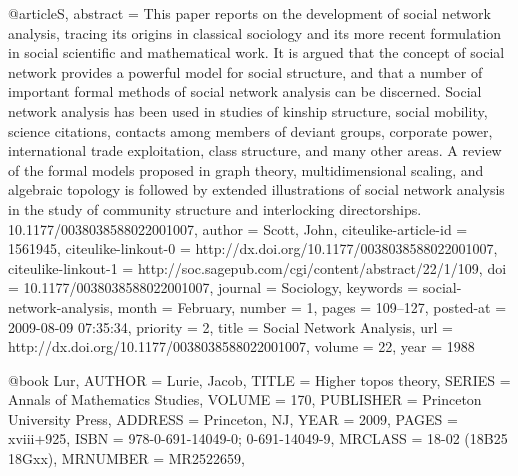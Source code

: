 @article{S,
    abstract = {This paper reports on the development of social network analysis, tracing its origins in classical sociology and its more recent formulation in social scientific and mathematical work. It is argued that the concept of social network provides a powerful model for social structure, and that a number of important formal methods of social network analysis can be discerned. Social network analysis has been used in studies of kinship structure, social mobility, science citations, contacts among members of deviant groups, corporate power, international trade exploitation, class structure, and many other areas. A review of the formal models proposed in graph theory, multidimensional scaling, and algebraic topology is followed by extended illustrations of social network analysis in the study of community structure and interlocking directorships. 10.1177/0038038588022001007},
    author = {Scott, John},
    citeulike-article-id = {1561945},
    citeulike-linkout-0 = {http://dx.doi.org/10.1177/0038038588022001007},
    citeulike-linkout-1 = {http://soc.sagepub.com/cgi/content/abstract/22/1/109},
    doi = {10.1177/0038038588022001007},
    journal = {Sociology},
    keywords = {social-network-analysis},
    month = {February},
    number = {1},
    pages = {109--127},
    posted-at = {2009-08-09 07:35:34},
    priority = {2},
    title = {Social Network Analysis},
    url = {http://dx.doi.org/10.1177/0038038588022001007},
    volume = {22},
    year = {1988}
}

@book {Lur,
    AUTHOR = {Lurie, Jacob},
     TITLE = {Higher topos theory},
    SERIES = {Annals of Mathematics Studies},
    VOLUME = {170},
 PUBLISHER = {Princeton University Press},
   ADDRESS = {Princeton, NJ},
      YEAR = {2009},
     PAGES = {xviii+925},
      ISBN = {978-0-691-14049-0; 0-691-14049-9},
   MRCLASS = {18-02 (18B25 18Gxx)},
  MRNUMBER = {MR2522659},
}
		
		